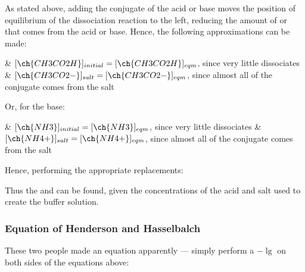 			\mathdiagram{
				\[ \MKa = \frac{[\ch{CH3CO2-}]_{eqm}[\ch{H+}]_{eqm}}{[\ch{CH3CO2H}]_{eqm}} \hspace{10mm}
				\MKb = \frac{[\ch{NH4+}]_{eqm}[\ch{OH-}]_{eqm}}{[\ch{NH3}]_{eqm}} \]
			}

			As stated above, adding the conjugate of the acid or base moves the position of equilibrium of the dissociation reaction to the left,
			reducing the amount of  or  that comes from the acid or base. Hence, the following approximations can be made:

			\begin{bulletlist}
				& $[\ch{CH3CO2H}]_{initial} = [\ch{CH3CO2H}]_{eqm}$, since very little  dissociates
				& $[\ch{CH3CO2-}]_{salt} = [\ch{CH3CO2-}]_{eqm}$, since almost all of the conjugate comes from the salt
			\end{bulletlist}

			Or, for the base:
			\begin{bulletlist}
				& $[\ch{NH3}]_{initial} = [\ch{NH3}]_{eqm}$, since very little  dissociates
				& $[\ch{NH4+}]_{salt} = [\ch{NH4+}]_{eqm}$, since almost all of the conjugate comes from the salt
			\end{bulletlist}

			Hence, performing the appropriate replacements:

			\mathdiagram{
				\[ \MKa = \frac{[\ch{H+}]_{eqm}[\mathrm{salt}]}{[\mathrm{acid}]} \hspace{12mm}
					\MKb = \frac{[\ch{OH-}]_{eqm}[\mathrm{salt}]}{[\mathrm{base}]} \]
			}

			\mathdiagram{
				\[ [\ch{H+}]_{eqm} = \MKa \times \frac{[\mathrm{acid}]}{[\mathrm{salt}]} \hspace{12mm}
					[\ch{OH-}]_{eqm} = \MKb \times \frac{[\mathrm{base}]}{[\mathrm{salt}]} \]
			}


			Thus the \pH{} and \pOH{} can be found, given the concentrations of the acid and salt used to create the buffer solution.

			\subsubsection{Equation of Henderson and Hasselbalch}

				These two people made an equation apparently --- simply perform a $-\lg{}$ on both sides of the equations above:
				\mathdiagram{
					\[ \MpH = \MpKa + \lg{\frac{[\mathrm{salt}]}{[\mathrm{acid}]}}    \hspace{12mm}
						\MpOH = \MpKb + \lg{\frac{[\mathrm{salt}]}{[\mathrm{base}]}} \]
				}

